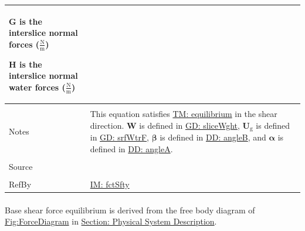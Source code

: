 \documentclass[12pt]{article}
\begin{document}
\begin{minipage}{\textwidth}
\begin{tabular}{>{\raggedright}p{}>{\raggedright\arraybackslash}p{}}
\begin{symbDescription}
              \item{$\mathbf{G}$ is the interslice normal forces ($\frac{\text{N}}{\text{m}}$)}
              \item{$\mathbf{H}$ is the interslice normal water forces ($\frac{\text{N}}{\text{m}}$)}
              \end{symbDescription}
\\ \midrule \\
Notes & This equation satisfies \hyperref[TM:equilibrium]{TM: equilibrium} in the shear direction. $\mathbf{W}$ is defined in \hyperref[GD:sliceWght]{GD: sliceWght}, ${\mathbf{U}_{\text{g}}}$ is defined in \hyperref[GD:srfWtrF]{GD: srfWtrF}, $\mathbf{β}$ is defined in \hyperref[DD:angleB]{DD: angleB}, and $\mathbf{α}$ is defined in \hyperref[DD:angleA]{DD: angleA}.
\\ \midrule \\
Source & \cite{chen2005}
\\ \midrule \\
RefBy & \hyperref[IM:fctSfty]{IM: fctSfty}
\\ \bottomrule
\end{tabular}
\end{minipage}
\paragraph{}
\label{GD:bsShrFEqDeriv}
Base shear force equilibrium is derived from the free body diagram of \hyperref[Figure:ForceDiagram]{Fig:ForceDiagram} in \hyperref[Sec:PhysSyst]{Section: Physical System Description}.
\par~
\end{document}
